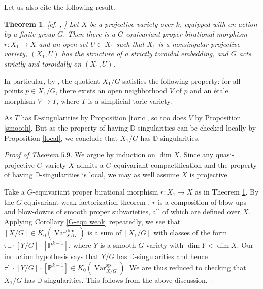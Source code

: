\documentclass{amsart}
\newtheorem{thm}{Theorem}[section]
\theoremstyle{definition}
\DeclareMathOperator{\Var}{Var}
\DeclareMathOperator{\spr}{sp}
\numberwithin{equation}{section}
\begin{document}
Let us also cite the following result.

\begin{thm}\label{toroidally}[cf. \cite[Theorem $0.1$]{abramovichwang}, \cite[Theorem $3.3$]{esserquotient}]
Let $X$ be a projective variety over $k$, equipped with an action by a finite group $G$. Then there is a $G$-equivariant proper birational morphism $r:X_1 \rightarrow X$ and an open set $U \subset X_1$ such that $X_1$ is a nonsingular projective variety, $(X_1, U)$ has the structure of a strictly toroidal embedding, and $G$ acts strictly and toroidally on $(X_1, U)$.
\end{thm}

In particular, by \cite[Proposition $2.13$]{esserquotient}, the quotient $X_1/G$ satisfies the following property: for all points $p \in X_1/G$, there exists an open neighborhood $V$ of $p$ and an étale morphism $V \rightarrow T$, where $T$ is a simplicial toric variety. 

As $T$ has $\mathbb{D}$-singularities by Proposition \ref{toric}, so too does $V$ by Proposition \ref{smooth}. But as the property of having $\mathbb{D}$-singularities can be checked locally by Proposition \ref{local}, we conclude that $X_1/G$ has $\mathbb{D}$-singularities.


\begin{proof}[Proof of Theorem $5.9$]
We argue by induction on $\dim X$. Since any quasi-projective $G$-variety $X$ admits a $G$-equivariant compactification and the property of having $\mathbb{D}$-singularities is local, we may as well assume $X$ is projective.

Take a $G$-equivariant proper birational morphism $r:X_1 \rightarrow X$ as in Theorem \ref{toroidally}. By the $G$-equivariant weak factorization theorem \cite{weakfactorization}, $r$ is a composition of blow-ups and blow-downs of smooth proper subvarieties, all of which are defined over $X$. Applying Corollary \ref{G-equ weak} repeatedly, we see that $[X/G] \in K_0(\Var_{X/G}^{\dim})$ is a sum of $[X_1/G]$ with classes of the form $\tau \mathbb{L} \cdot [Y/G] \cdot [\mathbb{P}^{k-1}]$, where $Y$ is a smooth $G$-variety with $\dim Y < \dim X$. Our induction hypothesis says that $Y/G$ has $\mathbb{D}$-singularities and hence $\tau \mathbb{L} \cdot [Y/G] \cdot [\mathbb{P}^{k-1}] \in K_0(\Var_{X/G}^{\spr})$. We are thus reduced to checking that $X_1/G$ has $\mathbb{D}$-singularities. This follows from the above discussion.
\end{proof}
\end{document}
